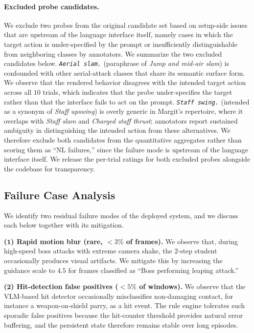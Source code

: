 \paragraph{Excluded probe candidates.}
We exclude two probes from the original candidate set based on setup-side issues that are upstream of the language interface itself, namely cases in which the target action is under-specified by the prompt or insufficiently distinguishable from neighboring classes by annotators. We summarize the two excluded candidates below.
\textit{\texttt{Aerial slam.}} (paraphrase of \textit{Jump and mid-air slam}) is confounded with other aerial-attack classes that share its semantic surface form. We observe that the rendered behavior disagrees with the intended target action across all $10$ trials, which indicates that the probe under-specifies the target rather than that the interface fails to act on the prompt.
\textit{\texttt{Staff swing.}} (intended as a synonym of \textit{Staff upswing}) is overly generic in Margit's repertoire, where it overlaps with \textit{Staff slam} and \textit{Charged staff thrust}; annotators report sustained ambiguity in distinguishing the intended action from these alternatives.
We therefore exclude both candidates from the quantitative aggregates rather than scoring them as ``NL failures,'' since the failure mode is upstream of the language interface itself. We release the per-trial ratings for both excluded probes alongside the codebase for transparency.

\subsection{Failure Case Analysis}
\label{app:failure}

We identify two residual failure modes of the deployed system, and we discuss each below together with its mitigation.

\textbf{($\mathbf{1}$) Rapid motion blur (rare, $<3\%$ of frames).}
We observe that, during high-speed boss attacks with extreme camera shake, the $2$-step student occasionally produces visual artifacts. We mitigate this by increasing the guidance scale to $4.5$ for frames classified as ``Boss performing leaping attack.''

\textbf{($\mathbf{2}$) Hit-detection false positives ($<5\%$ of windows).}
We observe that the VLM-based hit detector occasionally misclassifies non-damaging contact, for instance a weapon-on-shield parry, as a hit event. The rule engine tolerates such sporadic false positives because the hit-counter threshold provides natural error buffering, and the persistent state therefore remains stable over long episodes.


